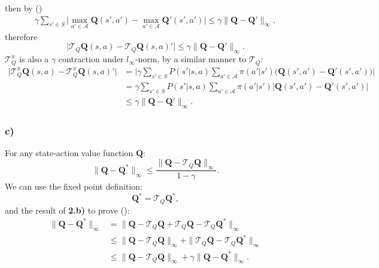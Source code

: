 \documentclass[12pt]{article}
\begin{document}
then by ()
\begin{equation*}
    \begin{split}
        \gamma \sum_{s'\in S}\Big|\max_{a' \in \mathcal{A}}\mathbf{Q}(s',a')-\max_{a' \in \mathcal{A}}\mathbf{Q}'(s',a')\Big| \leq \gamma \|\mathbf{Q} - \mathbf{Q'}\|_\infty,
    \end{split}
\end{equation*}
therefore
\begin{equation*}
    \Big|\mathcal{T}_Q\mathbf{Q}(s,a)-\mathcal{T}_Q\mathbf{Q}(s,a)'\Big| \leq \gamma \|\mathbf{Q} - \mathbf{Q'}\|_\infty.
\end{equation*}
$\mathcal{T}^\pi_Q$ is also a $\gamma$ contraction under $l_\infty$-norm, by a similar manner to $\mathcal{T}_Q$:
\begin{equation}
    \begin{split}
        \Big|\mathcal{T}^\pi_Q\mathbf{Q}(s,a)-\mathcal{T}^\pi_Q\mathbf{Q}(s,a)'\Big| &= \Big|\gamma \sum_{s'\in S}P(s'|s,a)\sum_{a'\in \mathcal{A}}\pi(a'|s')\Big(\mathbf{Q}(s',a')-\mathbf{Q}'(s',a')\Big)\Big| \\
        &= \gamma \sum_{s'\in S}P(s'|s,a)\sum_{a'\in \mathcal{A}}\pi(a'|s')\Big|\mathbf{Q}(s',a')-\mathbf{Q}'(s',a')\Big| \\
        &\leq \gamma \|\mathbf{Q} - \mathbf{Q'}\|_\infty.
    \end{split}
\end{equation}
\subsubsection*{c)}
For any state-action value function $\mathbf{Q}$:
\begin{equation}
    \|\mathbf{Q} - \mathbf{Q}^*\|_\infty \leq \frac{\|\mathbf{Q} - \mathcal{T}_Q\mathbf{Q}\|_\infty}{1-\gamma}.
    \label{eq:2cproblem}
\end{equation}
We can use the fixed point definition:
\begin{equation}
    \mathbf{Q}^* = \mathcal{T}_Q\mathbf{Q}^*,
\end{equation}
and the result of \textbf{2.b)} to prove (): 
\begin{equation*}
    \begin{split}
        \|\mathbf{Q} - \mathbf{Q}^*\|_\infty &= \|\mathbf{Q} - \mathcal{T}_Q\mathbf{Q} + \mathcal{T}_Q\mathbf{Q} -\mathcal{T}_Q\mathbf{Q}^*\|_\infty \\
        &\leq \|\mathbf{Q} - \mathcal{T}_Q\mathbf{Q}\|_\infty + \|\mathcal{T}_Q\mathbf{Q} -\mathcal{T}_Q\mathbf{Q}^*\|_\infty \\
        &\leq \|\mathbf{Q} - \mathcal{T}_Q\mathbf{Q}\|_\infty + \gamma \|\mathbf{Q} - \mathbf{Q}^*\|_\infty.
    \end{split}
\end{equation*}
\end{document}
